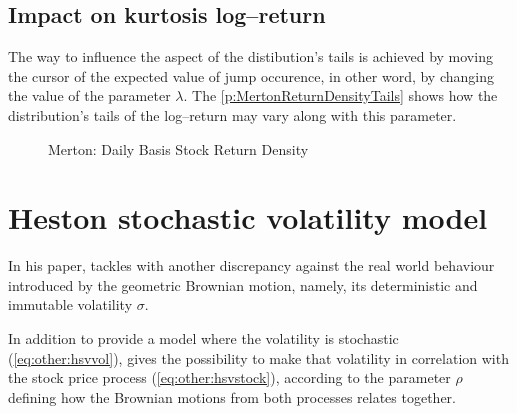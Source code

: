\documentclass[12pt]{report}
\begin{document}
\subsection{Impact on kurtosis log--return}
\label{sub:MertonKurtosis}

The way to influence the aspect of the distibution's tails is achieved by moving the cursor of the expected value of jump occurence, in other word, by changing the value of the parameter $\lambda$. The \cref{p:MertonReturnDensityTails} shows how the distribution's tails of the log--return may vary along with this parameter.

\begin{figure}[!h]
\centering

\caption{Merton: Daily Basis Stock Return Density}
\label{plot:MertonReturnDensityTails}
\end{figure}













\section{Heston stochastic volatility model}
\label{sec:other:heston}

In his paper, \citet{heston1993} tackles with another discrepancy against the real world behaviour introduced by the geometric Brownian motion, namely, its deterministic and immutable volatility $\sigma$.

In addition to provide a model where the volatility is stochastic (\cref{eq:other:hsvvol}), \citet{heston1993} gives the possibility to make that volatility in correlation with the stock price process (\cref{eq:other:hsvstock}), according to the parameter $\rho$ defining how the Brownian motions from both processes relates together.
\end{document}
